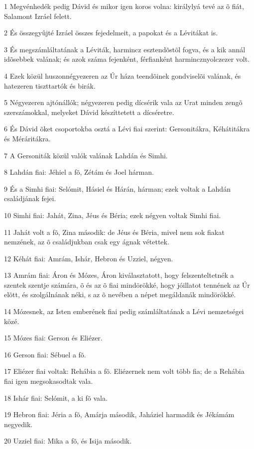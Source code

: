 \par 1 Megvénhedék pedig Dávid és mikor igen koros volna: királylyá tevé az õ fiát, Salamont Izráel felett.
\par 2 És összegyûjté Izráel összes fejedelmeit, a papokat és a Lévitákat is.
\par 3 És megszámláltatának a Léviták, harmincz esztendõstõl fogva, és a kik annál idõsebbek valának; és azok száma fejenként, férfianként harmincznyolczezer volt.
\par 4 Ezek közül huszonnégyezeren az Úr háza teendõinek gondviselõi valának, és hatezeren tiszttartók és birák.
\par 5 Négyezeren ajtónállók; négyezeren pedig dícsérik vala az Urat minden zengõ szerszámokkal, melyeket Dávid készíttetett a dícséretre.
\par 6 És Dávid õket csoportokba osztá a Lévi fiai szerint: Gersonitákra, Kéhátitákra és Méráritákra.
\par 7 A Gersoniták közül valók valának Lahdán és Simhi.
\par 8 Lahdán fiai: Jéhiel a fõ, Zétám és Joel hárman.
\par 9 És a Simhi fiai: Selómit, Hásiel és Hárán, hárman; ezek voltak a Lahdán családjának fejei.
\par 10 Simhi fiai: Jahát, Zina, Jéus és Béria; ezek négyen voltak Simhi fiai.
\par 11 Jahát volt a fõ, Zina második: de Jéus és Béria, mivel nem sok fiakat nemzének, az õ családjukban csak egy ágnak vétettek.
\par 12 Kéhát fiai: Amrám, Ishár, Hebron és Uzziel, négyen.
\par 13 Amrám fiai: Áron és Mózes, Áron kiválasztatott, hogy felszenteltetnék a szentek  szentje számára, õ és az õ fiai mindörökké, hogy jóillatot tennének az Úr elõtt, és szolgálnának néki, s az õ nevében a népet megáldanák mindörökké.
\par 14 Mózesnek, az Isten emberének fiai pedig számláltatának a Lévi nemzetségei közé.
\par 15 Mózes fiai: Gerson és Eliézer.
\par 16 Gerson fiai: Sébuel a fõ.
\par 17 Eliézer fiai voltak: Rehábia a fõ. Eliézernek nem volt több fia; de a Rehábia fiai igen megsokasodtak vala.
\par 18 Ishár fiai: Selómit, a ki fõ vala.
\par 19 Hebron fiai: Jéria a fõ, Amárja második, Jaháziel harmadik és Jékámám negyedik.
\par 20 Uzziel fiai: Mika a fõ, és Isija második.
